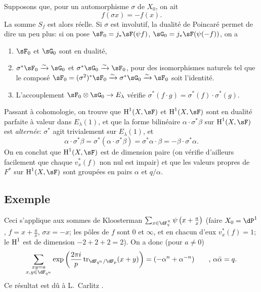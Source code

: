 Supposons que, pour un automorphisme $\sigma$ de $X_0$, on ait 
\[
  f(\sigma x) = - f(x) \text{.} 
\]
La somme $S_f$ est alors r\'eelle. Si $\sigma$ est involutif, la dualit\'e de 
Poincar\'e permet de dire un peu plus: si on pose 
$\sF_0=j_\ast \sF(\psi f)$, $\sG_0 = j_\ast \sF(\psi(-f))$, on a 
\begin{enumerate}[\indent a)]
  \item $\sF_0$ et $\sG_0$ sont en dualit\'e, 
  \item $\sigma^\ast \sF_0 \iso \sG_0$ et $\sigma^\ast \sG_0 \iso \sF_0$, pour 
    des isomorphismes naturels tel que le compos\'e 
    $\sF_0=(\sigma^2)^\ast \sF_0 \iso \sigma^\ast \sG_0 \iso \sF_0$ soit 
    l'identit\'e. 
  \item L'accouplement $\sF_0\otimes \sG_0 \to E_\lambda$ v\'erifie 
    $\sigma^\ast(f\cdot g) = \sigma^\ast(f) \cdot \sigma^\ast (g)$. 
\end{enumerate} 

Passant \`a cohomologie, on trouve que $\h^1(X,\sF)$ et $\h^1(X,\sF)$ sont en 
dualit\'e parfaite \`a valeur dans $E_\lambda(1)$, et que la forme bilin\'eaire 
$\alpha\cdot \sigma^\ast\beta$ sur $\h^1(X,\sF)$ est \emph{altern\'ee}: 
$\sigma^\ast$ agit trivialement sur $E_\lambda(1)$, et 
\[
  \alpha\cdot \sigma^\ast \beta = \sigma^\ast(\alpha\cdot \sigma^\ast \beta) = \sigma^\ast \alpha\cdot \beta = -\beta\cdot \sigma^\ast \alpha \text{.} 
\]
On en conclut que $\h^1(X,\sF)$ est de dimension paire (on v\'erifie d'ailleurs 
facilement que chaque $v_x^\ast(f)$ non nul est impair) et que les valeurs 
propres de $F^\ast$ sur $\h^1(X,\sF)$ sont group\'ees en pairs $\alpha$ et 
$q/\alpha$. 





\subsection{Exemple}\label{VI:3-7}

Ceci s'applique aux sommes de Kloosterman 
$\sum_{x\in \dF_q^\times} \psi\left(x+\frac a x\right)$ (faire 
$X_0=\dP^1$, $f=x+\frac a x$, $\sigma x=-x$; les p\^oles de $f$ sont $0$ et 
$\infty$, et en chacun d'eux $v_x^\ast(f)=1$; le $\operatorname{H}^1$ est de dimension 
$-2+2+2=2$). On a donc (pour $a\ne 0$) 
\[
  \sum_{\substack{x y=a \\ x,y\in \dF_{q^n}}} \exp\left(\frac{2\pi i}{p} \tr_{\dF_{q^n}/\dF_p}(x+y)\right) = (-\alpha^n+\alpha^{-n}) \qquad \text{, }\alpha\bar \alpha = q \text{.} 
\]
Ce r\'esultat est d\^u \`a L.\ Carlitz \cite{ca69}. 

